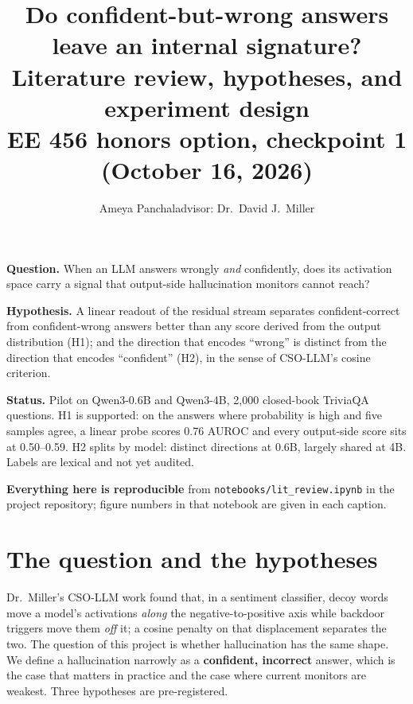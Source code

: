 \documentclass[11pt]{article}
\title{\vspace{-1.2em}Do confident-but-wrong answers leave an internal signature?\\
\large Literature review, hypotheses, and experiment design\\[-2pt]
\normalsize EE 456 honors option, checkpoint 1 (October 16, 2026)}
\author{Ameya Panchal\quad\textcolor{muted}{advisor: Dr.\ David J.\ Miller}}
\date{}
\begin{document}
\maketitle
\vspace{-2.5em}

\begin{tcolorbox}[colback=card,colframe=card,arc=2pt,left=8pt,right=8pt,top=6pt,bottom=6pt]
\textbf{Question.} When an LLM answers wrongly \emph{and} confidently, does its activation space carry a signal that output-side hallucination monitors cannot reach?

\textbf{Hypothesis.} A linear readout of the residual stream separates confident-correct from confident-wrong answers better than any score derived from the output distribution (H1); and the direction that encodes ``wrong'' is distinct from the direction that encodes ``confident'' (H2), in the sense of CSO-LLM's cosine criterion.

\textbf{Status.} Pilot on Qwen3-0.6B and Qwen3-4B, 2{,}000 closed-book TriviaQA questions. H1 is supported: on the answers where probability is high and five samples agree, a linear probe scores 0.76 AUROC and every output-side score sits at 0.50--0.59. H2 splits by model: distinct directions at 0.6B, largely shared at 4B. Labels are lexical and not yet audited.

\textbf{Everything here is reproducible} from \texttt{notebooks/lit\_review.ipynb} in the project repository; figure numbers in that notebook are given in each caption.
\end{tcolorbox}

\section{The question and the hypotheses}

Dr.\ Miller's CSO-LLM work found that, in a sentiment classifier, decoy words move a model's activations \emph{along} the negative-to-positive axis while backdoor triggers move them \emph{off} it; a cosine penalty on that displacement separates the two. The question of this project is whether hallucination has the same shape. We define a hallucination narrowly as a \textbf{confident, incorrect} answer, which is the case that matters in practice and the case where current monitors are weakest. Three hypotheses are pre-registered.
\end{document}
